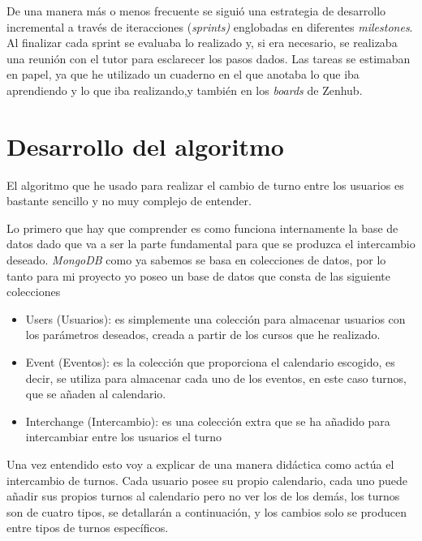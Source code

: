  
 De una manera más o menos frecuente se siguió una estrategia de desarrollo incremental a través de iteracciones (\emph{sprints)} englobadas en diferentes \emph{milestones}. Al finalizar cada sprint se evaluaba lo realizado y, si era necesario, se realizaba una reunión con el tutor para esclarecer los pasos dados. Las tareas se estimaban en papel, ya que he utilizado un cuaderno en el que anotaba lo que iba aprendiendo y lo que iba realizando,y también en  los \emph{boards} de Zenhub. 
 
   \section{Desarrollo del algoritmo}\label{dweb}
   El algoritmo que he usado para realizar el cambio de turno entre los usuarios es bastante sencillo y no muy complejo de entender.
   
   Lo primero que hay que comprender es como funciona internamente la base de datos dado que va a ser la parte fundamental para que se produzca el intercambio deseado. \emph{MongoDB} como ya sabemos  se basa en colecciones de datos, por lo tanto para mi proyecto yo poseo un base de datos que consta de las siguiente colecciones
   
   
   \begin{itemize}
	\item Users (Usuarios): es simplemente una colección para almacenar usuarios con los parámetros deseados, creada a partir de los cursos que he realizado.
	\item Event (Eventos): es la colección que proporciona el calendario escogido, es decir, se utiliza para almacenar cada uno de los eventos, en este caso turnos, que se añaden al calendario.
	\item Interchange (Intercambio): es una colección extra que se ha añadido para intercambiar entre los usuarios el turno
	\end{itemize}
   
   
   Una vez entendido esto voy a explicar de una manera didáctica como actúa el intercambio de turnos. Cada usuario posee su propio calendario, cada uno puede añadir sus propios turnos al calendario pero no ver los de los demás, los turnos son de cuatro tipos, se detallarán a continuación, y los cambios solo se producen entre tipos de turnos específicos. 

